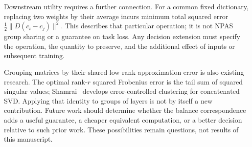 Downstream utility requires a further connection. For a common fixed dictionary, replacing two weights by their average incurs minimum total squared error $\frac12\|D(c_i-c_j)\|^2$. This describes that particular operation; it is not NPAS group sharing or a guarantee on task loss. Any decision extension must specify the operation, the quantity to preserve, and the additional effect of inputs or subsequent training.

Grouping matrices by their shared low-rank approximation error is also existing research. The optimal rank-$r$ squared Frobenius error is the tail sum of squared singular values; Shamrai~\cite{svd} develops error-controlled clustering for concatenated SVD. Applying that identity to groups of layers is not by itself a new contribution. Future work should determine whether the balance correspondence adds a useful guarantee, a cheaper equivalent computation, or a better decision relative to such prior work. These possibilities remain questions, not results of this manuscript.
